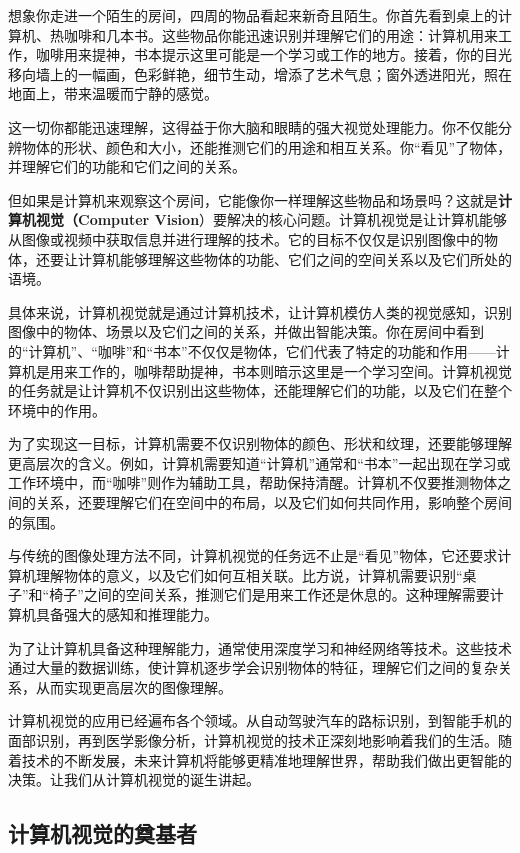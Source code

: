 想象你走进一个陌生的房间，四周的物品看起来新奇且陌生。你首先看到桌上的计算机、热咖啡和几本书。这些物品你能迅速识别并理解它们的用途：计算机用来工作，咖啡用来提神，书本提示这里可能是一个学习或工作的地方。接着，你的目光移向墙上的一幅画，色彩鲜艳，细节生动，增添了艺术气息；窗外透进阳光，照在地面上，带来温暖而宁静的感觉。

这一切你都能迅速理解，这得益于你大脑和眼睛的强大视觉处理能力。你不仅能分辨物体的形状、颜色和大小，还能推测它们的用途和相互关系。你“看见”了物体，并理解它们的功能和它们之间的关系。

但如果是计算机来观察这个房间，它能像你一样理解这些物品和场景吗？这就是\textbf{计算机视觉（Computer Vision}）要解决的核心问题。计算机视觉是让计算机能够从图像或视频中获取信息并进行理解的技术。它的目标不仅仅是识别图像中的物体，还要让计算机能够理解这些物体的功能、它们之间的空间关系以及它们所处的语境。

具体来说，计算机视觉就是通过计算机技术，让计算机模仿人类的视觉感知，识别图像中的物体、场景以及它们之间的关系，并做出智能决策。你在房间中看到的“计算机”、“咖啡”和“书本”不仅仅是物体，它们代表了特定的功能和作用——计算机是用来工作的，咖啡帮助提神，书本则暗示这里是一个学习空间。计算机视觉的任务就是让计算机不仅识别出这些物体，还能理解它们的功能，以及它们在整个环境中的作用。

为了实现这一目标，计算机需要不仅识别物体的颜色、形状和纹理，还要能够理解更高层次的含义。例如，计算机需要知道“计算机”通常和“书本”一起出现在学习或工作环境中，而“咖啡”则作为辅助工具，帮助保持清醒。计算机不仅要推测物体之间的关系，还要理解它们在空间中的布局，以及它们如何共同作用，影响整个房间的氛围。

与传统的图像处理方法不同，计算机视觉的任务远不止是“看见”物体，它还要求计算机理解物体的意义，以及它们如何互相关联。比方说，计算机需要识别“桌子”和“椅子”之间的空间关系，推测它们是用来工作还是休息的。这种理解需要计算机具备强大的感知和推理能力。

为了让计算机具备这种理解能力，通常使用深度学习和神经网络等技术。这些技术通过大量的数据训练，使计算机逐步学会识别物体的特征，理解它们之间的复杂关系，从而实现更高层次的图像理解。

计算机视觉的应用已经遍布各个领域。从自动驾驶汽车的路标识别，到智能手机的面部识别，再到医学影像分析，计算机视觉的技术正深刻地影响着我们的生活。随着技术的不断发展，未来计算机将能够更精准地理解世界，帮助我们做出更智能的决策。让我们从计算机视觉的诞生讲起。

\subsection{计算机视觉的奠基者}

